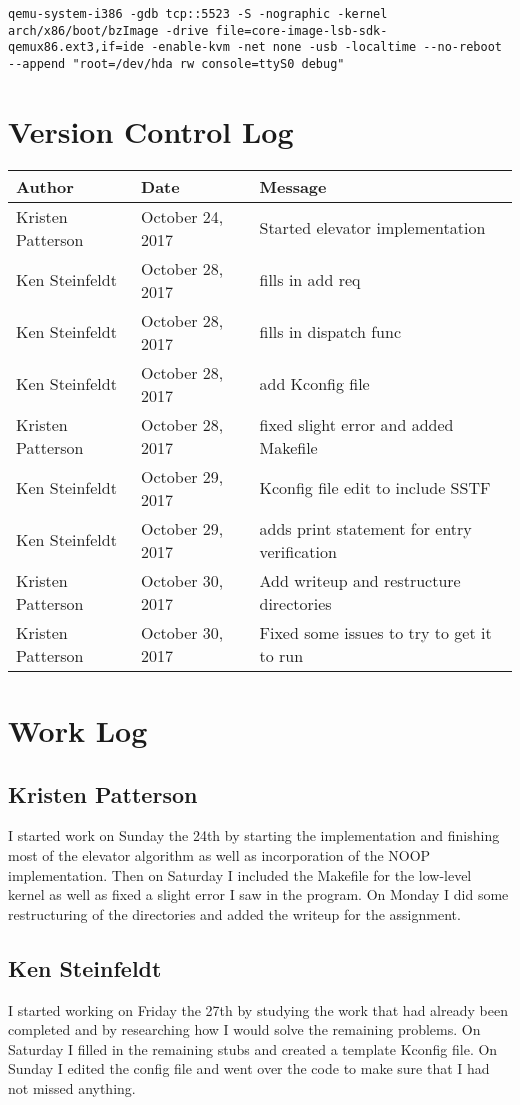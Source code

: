 \documentclass[10pt,letterpaper,onecolumn,draftclsnofoot]{IEEEtran}
\begin{document}
\begin{lstlisting}
qemu-system-i386 -gdb tcp::5523 -S -nographic -kernel arch/x86/boot/bzImage -drive file=core-image-lsb-sdk-qemux86.ext3,if=ide -enable-kvm -net none -usb -localtime --no-reboot --append "root=/dev/hda rw console=ttyS0 debug"
\end{lstlisting}

\section{Version Control Log}

\begin{center}
	\begin{tabular}{|l|l|l|}
		\hline
		\textbf{Author} & \textbf{Date} & \textbf{Message} \\ \hline
		Kristen Patterson & October 24, 2017 & Started elevator implementation \\ \hline
		Ken Steinfeldt & October 28, 2017 & fills in add req \\ \hline
		Ken Steinfeldt & October 28, 2017 & fills in dispatch func \\ \hline
		Ken Steinfeldt & October 28, 2017 & add Kconfig file \\ \hline
		Kristen Patterson & October 28, 2017 & fixed slight error and added Makefile \\ \hline
		Ken Steinfeldt & October 29, 2017 & Kconfig file edit to include SSTF \\ \hline
		Ken Steinfeldt & October 29, 2017 & adds print statement for entry verification \\ \hline
		Kristen Patterson & October 30, 2017 & Add writeup and restructure directories \\ \hline
		Kristen Patterson & October 30, 2017 & Fixed some issues to try to get it to run \\ \hline
	\end{tabular}
\end{center}

\section{Work Log}
\subsection{Kristen Patterson}
I started work on Sunday the 24th by starting the implementation and finishing most of the elevator algorithm as well as incorporation of the NOOP implementation.
Then on Saturday I included the Makefile for the low-level kernel as well as fixed a slight error I saw in the program.
On Monday I did some restructuring of the directories and added the writeup for the assignment.

\subsection{Ken Steinfeldt}
I started working on Friday the 27th by studying the work that had already been completed and by researching how I would solve the remaining problems.
	On Saturday I filled in the remaining stubs and created a template Kconfig file.
	On Sunday I edited the config file and went over the code to make sure that I had not missed anything.
\end{document}
